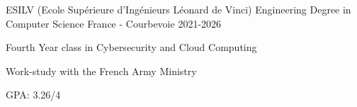 

\begin{cventries}

	\edentry
	{ESILV (Ecole Supérieure d'Ingénieurs Léonard de Vinci)} %
	{Engineering Degree in Computer Science} %
	{France - Courbevoie} %
    {2021-2026}
	{
		\begin{cvitems} %
			\item {Fourth Year class in Cybersecurity and Cloud Computing}
			\item { Work-study with the French Army Ministry}
		\end{cvitems}
	}
	{GPA: 3.26/4}

\end{cventries}
